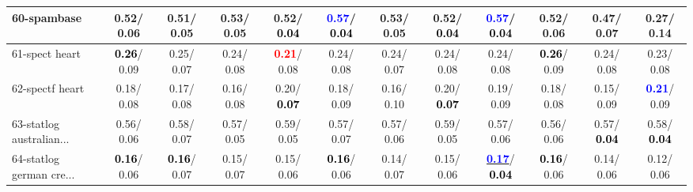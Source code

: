 \begin{table}[h]
\begin{center}
{\begin{tabular}{lc|c|c|c|c|c|c|c|c|c|c}
60-spambase &   0.52/  0.06 &   0.51/  0.05 &   0.53/  0.05 &   0.52/\textcolor{black}{\textbf{  0.04}} & \textcolor{blue}{\textbf{  0.57}}/\textcolor{black}{\textbf{  0.04}} &   0.53/  0.05 &   0.52/\textcolor{black}{\textbf{  0.04}} & \textcolor{blue}{\textbf{  0.57}}/\textcolor{black}{\textbf{  0.04}} &   0.52/  0.06 &   0.47/  0.07 &   0.27/  0.14 \\ \hline
61-spect heart & \textcolor{black}{\textbf{  0.26}}/  0.09 &   0.25/  0.07 &   0.24/  0.08 & \textcolor{red}{\textbf{  0.21}}/  0.08 &   0.24/  0.08 &   0.24/  0.07 &   0.24/  0.08 &   0.24/  0.08 & \textcolor{black}{\textbf{  0.26}}/  0.09 &   0.24/  0.08 &   0.23/  0.08 \\
62-spectf heart &   0.18/  0.08 &   0.17/  0.08 &   0.16/  0.08 &   0.20/\textcolor{black}{\textbf{  0.07}} &   0.18/  0.09 &   0.16/  0.10 &   0.20/\textcolor{black}{\textbf{  0.07}} &   0.19/  0.09 &   0.18/  0.08 &   0.15/  0.09 & \textcolor{blue}{\textbf{  0.21}}/  0.09 \\
63-statlog australian... &   0.56/  0.06 &   0.58/  0.07 &   0.57/  0.05 &   0.59/  0.05 &   0.57/  0.07 &   0.57/  0.06 &   0.59/  0.05 &   0.57/  0.06 &   0.56/  0.06 &   0.57/\textcolor{black}{\textbf{  0.04}} &   0.58/\textcolor{black}{\textbf{  0.04}} \\
64-statlog german cre... & \textcolor{black}{\textbf{  0.16}}/  0.06 & \textcolor{black}{\textbf{  0.16}}/  0.07 &   0.15/  0.07 &   0.15/  0.06 & \textcolor{black}{\textbf{  0.16}}/  0.06 &   0.14/  0.07 &   0.15/  0.06 & \underline{\textcolor{blue}{\textbf{  0.17}}}/\textcolor{black}{\textbf{  0.04}} & \textcolor{black}{\textbf{  0.16}}/  0.06 &   0.14/  0.06 &   0.12/  0.06 \\\end{tabular}
}\label{strats1a5NN}
\end{center}
\end{table}
